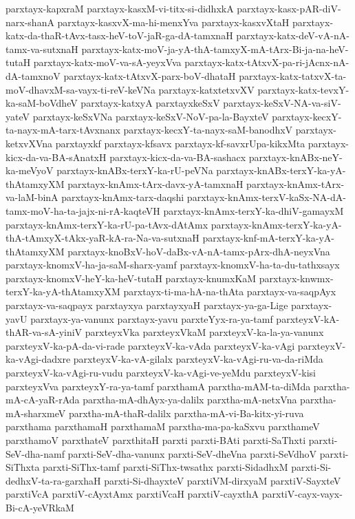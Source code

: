 {parxtayx-kapxraM
parxtayx-kasxM-vi-titx-si-didhxkA
parxtayx-kasx-pAR-diV-narx-shanA
parxtayx-kasxvX-ma-hi-menxYva
parxtayx-kasxvXtaH
parxtayx-katx-da-thaR-tAvx-tasx-heV-toV-jaR-ga-dA-tamxnaH
parxtayx-katx-deV-vA-nA-tamx-va-sutxnaH
parxtayx-katx-moV-ja-yA-thA-tamxyX-mA-tArx-Bi-ja-na-heV-tutaH
parxtayx-katx-moV-va-sA-yeyxVva
parxtayx-katx-tAtxvX-pa-ri-jAcnx-nA-dA-tamxnoV
parxtayx-katx-tAtxvX-parx-boV-dhataH
parxtayx-katx-tatxvX-ta-moV-dhavxM-sa-vayx-ti-reV-keVNa
parxtayx-katxtetxvXV
parxtayx-katx-tevxY-ka-saM-boVdheV
parxtayx-katxyA
parxtayxkeSxV
parxtayx-keSxV-NA-va-siV-yateV
parxtayx-keSxVNa
parxtayx-keSxV-NoV-pa-la-BayxteV
parxtayx-kecxY-ta-nayx-mA-tarx-tAvxnanx
parxtayx-kecxY-ta-nayx-saM-banodhxV
parxtayx-ketxvXVna
parxtayxkf
parxtayx-kfsavx
parxtayx-kf-savxrUpa-kikxMta
parxtayx-kicx-da-va-BA-sAnatxH
parxtayx-kicx-da-va-BA-sashacx
parxtayx-knABx-neY-ka-meVyoV
parxtayx-knABx-terxY-ka-rU-peVNa
parxtayx-knABx-terxY-ka-yA-thAtamxyXM
parxtayx-knAmx-tArx-davx-yA-tamxnaH
parxtayx-knAmx-tArx-va-laM-binA
parxtayx-knAmx-tarx-daqshi
parxtayx-knAmx-terxV-kaSx-NA-dA-tamx-moV-ha-ta-jajx-ni-rA-kaqteVH
parxtayx-knAmx-terxY-ka-dhiV-gamayxM
parxtayx-knAmx-terxY-ka-rU-pa-tAvx-dAtAmx
parxtayx-knAmx-terxY-ka-yA-thA-tAmxyX-tAkx-yaR-kA-ra-Na-va-sutxnaH
parxtayx-knf-mA-terxY-ka-yA-thAtamxyXM
parxtayx-knoBxV-hoV-daBx-vA-nA-tamx-pArx-dhA-neyxVna
parxtayx-knomxV-ha-ja-saM-sharx-yamf
parxtayx-knomxV-ha-ta-du-tathxsayx
parxtayx-knomxV-heY-ka-heV-tutaH
parxtayx-knumxKaM
parxtayx-knwmx-terxY-ka-yA-thAtamxyXM
parxtayx-ti-ma-hA-na-thAta
parxtayx-va-saqpAyx
parxtayx-va-saqpayx
parxtayxya
parxtayxyaH
parxtayx-ya-ga-Lige
parxtayx-yavU
parxtayx-ya-vanunx
parxtayx-yavu
parxteYyx-ra-ya-tamf
parxteyxV-kA-thAR-va-sA-yiniV
parxteyxVka
parxteyxVkaM
parxteyxV-ka-la-ya-vanunx
parxteyxV-ka-pA-da-vi-rade
parxteyxV-ka-vAda
parxteyxV-ka-vAgi
parxteyxV-ka-vAgi-dadxre
parxteyxV-ka-vA-gilalx
parxteyxV-ka-vAgi-ru-va-da-riMda
parxteyxV-ka-vAgi-ru-vudu
parxteyxV-ka-vAgi-ve-yeMdu
parxteyxV-kisi
parxteyxVva
parxteyxY-ra-ya-tamf
parxthamA
parxtha-mAM-ta-diMda
parxtha-mA-cA-yaR-rAda
parxtha-mA-dhAyx-ya-dalilx
parxtha-mA-netxVna
parxtha-mA-sharxmeV
parxtha-mA-thaR-dalilx
parxtha-mA-vi-Ba-kitx-yi-ruva
parxthama
parxthamaH
parxthamaM
parxtha-ma-pa-kaSxvu
parxthameV
parxthamoV
parxthateV
parxthitaH
parxti
parxti-BAti
parxti-SaThxti
parxti-SeV-dha-namf
parxti-SeV-dha-vanunx
parxti-SeV-dheVna
parxti-SeVdhoV
parxti-SiThxta
parxti-SiThx-tamf
parxti-SiThx-twsathx
parxti-SidadhxM
parxti-Si-dedhxV-ta-ra-garxhaH
parxti-Si-dhayxteV
parxtiVM-dirxyaM
parxtiV-SayxteV
parxtiVcA
parxtiV-cAyxtAmx
parxtiVcaH
parxtiV-cayxthA
parxtiV-cayx-vayx-Bi-cA-yeVRkaM
}
